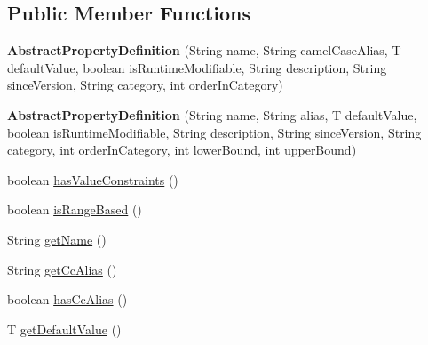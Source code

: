 \subsection*{Public Member Functions}
\begin{DoxyCompactItemize}
\item 
\mbox{\label{classcom_1_1mysql_1_1cj_1_1conf_1_1_abstract_property_definition_af8621793d8a8f9b8650e1499459fd543}} 
{\bfseries Abstract\+Property\+Definition} (String name, String camel\+Case\+Alias, T default\+Value, boolean is\+Runtime\+Modifiable, String description, String since\+Version, String category, int order\+In\+Category)
\item 
\mbox{\label{classcom_1_1mysql_1_1cj_1_1conf_1_1_abstract_property_definition_a7b63ae375eaec02cfcf511af7cc3876c}} 
{\bfseries Abstract\+Property\+Definition} (String name, String alias, T default\+Value, boolean is\+Runtime\+Modifiable, String description, String since\+Version, String category, int order\+In\+Category, int lower\+Bound, int upper\+Bound)
\item 
boolean \mbox{\hyperlink{classcom_1_1mysql_1_1cj_1_1conf_1_1_abstract_property_definition_a2a34114907269a32b04a433c42982355}{has\+Value\+Constraints}} ()
\item 
boolean \mbox{\hyperlink{classcom_1_1mysql_1_1cj_1_1conf_1_1_abstract_property_definition_a9395e63d016a2cf36bd19860dc160a29}{is\+Range\+Based}} ()
\item 
String \mbox{\hyperlink{classcom_1_1mysql_1_1cj_1_1conf_1_1_abstract_property_definition_a7b5a7c72c029a0d0b25658f61f2bca01}{get\+Name}} ()
\item 
String \mbox{\hyperlink{classcom_1_1mysql_1_1cj_1_1conf_1_1_abstract_property_definition_af42f8fd9bb3feef2843558105b4246a1}{get\+Cc\+Alias}} ()
\item 
boolean \mbox{\hyperlink{classcom_1_1mysql_1_1cj_1_1conf_1_1_abstract_property_definition_a5c08adb553273bffe89b193a112c21d3}{has\+Cc\+Alias}} ()
\item 
T \mbox{\hyperlink{classcom_1_1mysql_1_1cj_1_1conf_1_1_abstract_property_definition_a3ed1c7b670a446214f7e08b450c8688c}{get\+Default\+Value}} ()
\item 
\mbox{\label{classcom_1_1mysql_1_1cj_1_1conf_1_1_abstract_property_definition_aa91b691f396f34df18bb41178b9c23df}} 

\end{DoxyCompactItemize}
